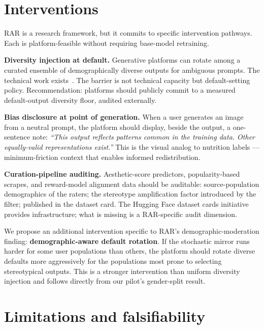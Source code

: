\documentclass[sigconf,nonacm]{acmart}
\begin{document}
\section{Interventions}

RAR is a research framework, but it commits to specific intervention pathways. Each is platform-feasible without requiring base-model retraining.

\textbf{Diversity injection at default.} Generative platforms can rotate among a curated ensemble of demographically diverse outputs for ambiguous prompts. The technical work exists~\cite{friedrich2023fair, naik2023social}. The barrier is not technical capacity but default-setting policy. Recommendation: platforms should publicly commit to a measured default-output diversity floor, audited externally.

\textbf{Bias disclosure at point of generation.} When a user generates an image from a neutral prompt, the platform should display, beside the output, a one-sentence note: \emph{``This output reflects patterns common in the training data. Other equally-valid representations exist.''} This is the visual analog to nutrition labels --- minimum-friction context that enables informed redistribution.

\textbf{Curation-pipeline auditing.} Aesthetic-score predictors, popularity-based scrapes, and reward-model alignment data should be auditable: source-population demographics of the raters; the stereotype amplification factor introduced by the filter; published in the dataset card. The Hugging Face dataset cards initiative provides infrastructure; what is missing is a RAR-specific audit dimension.

We propose an additional intervention specific to RAR's demographic-moderation finding: \textbf{demographic-aware default rotation}. If the stochastic mirror runs harder for some user populations than others, the platform should rotate diverse defaults more aggressively for the populations most prone to selecting stereotypical outputs. This is a stronger intervention than uniform diversity injection and follows directly from our pilot's gender-split result.

\section{Limitations and falsifiability}
\end{document}
